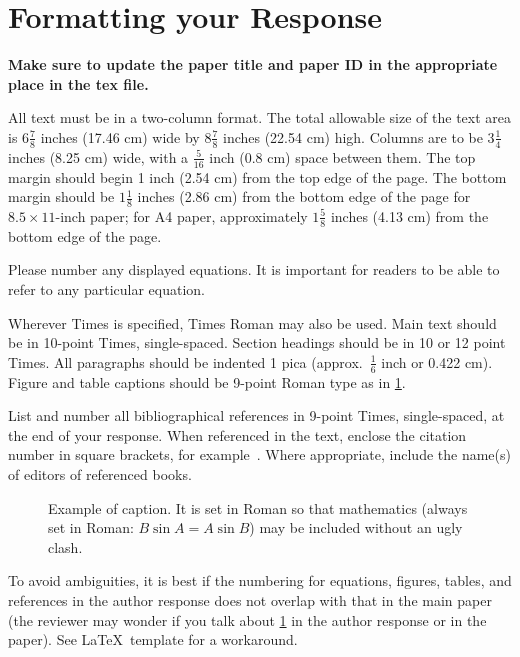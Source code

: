 \documentclass[10pt,twocolumn,letterpaper]{article}
\begin{document}
\section{Formatting your Response}

 {\bf Make sure to update the paper title and paper ID in the appropriate place in the tex file.}

All text must be in a two-column format.
The total allowable size of the text area is $6\frac78$ inches (17.46 cm) wide by $8\frac78$ inches (22.54 cm) high.
Columns are to be $3\frac14$ inches (8.25 cm) wide, with a $\frac{5}{16}$ inch (0.8 cm) space between them.
The top margin should begin 1 inch (2.54 cm) from the top edge of the page.
The bottom margin should be $1\frac{1}{8}$ inches (2.86 cm) from the bottom edge of the page for $8.5 \times 11$-inch paper;
for A4 paper, approximately $1\frac{5}{8}$ inches (4.13 cm) from the bottom edge of the page.

Please number any displayed equations.
It is important for readers to be able to refer to any particular equation.

Wherever Times is specified, Times Roman may also be used.
Main text should be in 10-point Times, single-spaced.
Section headings should be in 10 or 12 point Times.
All paragraphs should be indented 1 pica (approx.~$\frac{1}{6}$ inch or 0.422 cm).
Figure and table captions should be 9-point Roman type as in \cref{fig:onecol}.

List and number all bibliographical references in 9-point Times, single-spaced,
at the end of your response.
When referenced in the text, enclose the citation number in square brackets, for example~\cite{Alpher05}.
Where appropriate, include the name(s) of editors of referenced books.

\begin{figure}[t]
    \centering
    \fbox{\rule{0pt}{0.5in} \rule{0.9\linewidth}{0pt}}
    \caption{Example of caption.  It is set in Roman so that mathematics
        (always set in Roman: $B \sin A = A \sin B$) may be included without an
        ugly clash.}
    \label{fig:onecol}
\end{figure}

To avoid ambiguities, it is best if the numbering for equations, figures, tables, and references in the author response does not overlap with that in the main paper (the reviewer may wonder if you talk about \cref{fig:onecol} in the author response or in the paper).
See \LaTeX\ template for a workaround.
\end{document}
